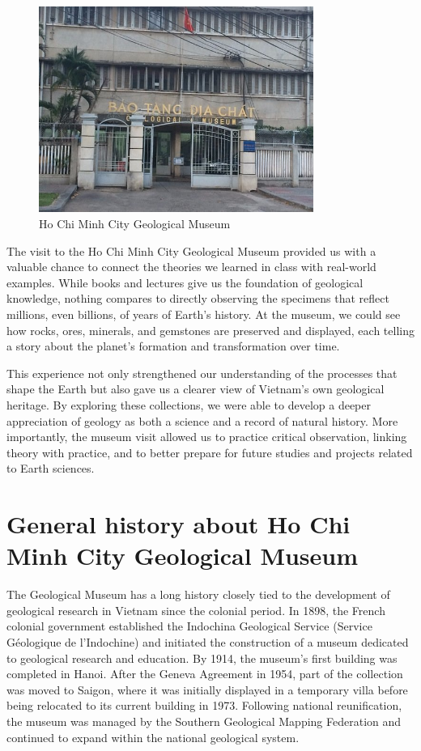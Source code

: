 \begin{figure}[H]
  \centering
  \includegraphics[width=0.8\textwidth]{graphics/figure_01.jpg}
  \caption{Ho Chi Minh City Geological Museum}
  \label{fig:museum}
\end{figure}

The visit to the Ho Chi Minh City Geological Museum provided us with a valuable chance to connect the theories we learned in class with real-world examples. While books and lectures give us the foundation of geological knowledge, nothing compares to directly observing the specimens that reflect millions, even billions, of years of Earth's history. At the museum, we could see how rocks, ores, minerals, and gemstones are preserved and displayed, each telling a story about the planet's formation and transformation over time.

This experience not only strengthened our understanding of the processes that shape the Earth but also gave us a clearer view of Vietnam's own geological heritage. By exploring these collections, we were able to develop a deeper appreciation of geology as both a science and a record of natural history. More importantly, the museum visit allowed us to practice critical observation, linking theory with practice, and to better prepare for future studies and projects related to Earth sciences.

\section{General history about Ho Chi Minh City Geological Museum}
\label{sec:history}

The Geological Museum has a long history closely tied to the development of geological research in Vietnam since the colonial period. In 1898, the French colonial government established the Indochina Geological Service (Service Géologique de l'Indochine) and initiated the construction of a museum dedicated to geological research and education. By 1914, the museum's first building was completed in Hanoi. After the Geneva Agreement in 1954, part of the collection was moved to Saigon, where it was initially displayed in a temporary villa before being relocated to its current building in 1973. Following national reunification, the museum was managed by the Southern Geological Mapping Federation and continued to expand within the national geological system.

